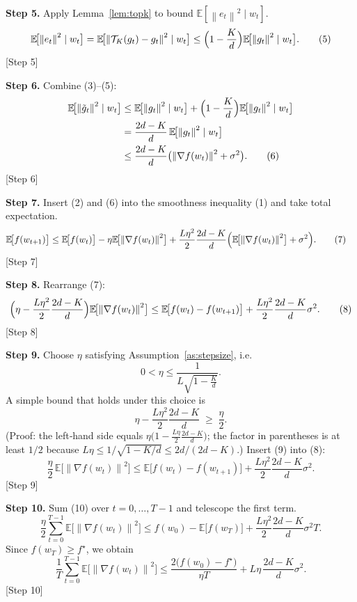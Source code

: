 \documentclass{article}
\newcommand{\E}{\mathbb{E}}
\newcommand{\norm}[1]{\left\|#1\right\|}
\newcommand{\topk}[1]{\mathcal{T}_K\!\left(#1\right)}
\begin{document}
\noindent\textbf{Step 5.} Apply Lemma~\ref{lem:topk} to bound $\E[\norm{e_t}^{2}\mid w_t]$.
\[
\E\!\bigl[\norm{e_t}^{2}\mid w_t\bigr]
   =\E\!\bigl[\norm{\topk{g_t}-g_t}^{2}\mid w_t\bigr]
   \le\Bigl(1-\frac{K}{d}\Bigr)\E\!\bigl[\norm{g_t}^{2}\mid w_t\bigr].
\tag{5}
\]
[Step 5]

\noindent\textbf{Step 6.} Combine (3)–(5):
\[
\begin{aligned}
\E\!\bigl[\norm{\tilde g_t}^{2}\mid w_t\bigr]
&\le \E\!\bigl[\norm{g_t}^{2}\mid w_t\bigr]
   +\Bigl(1-\frac{K}{d}\Bigr)\E\!\bigl[\norm{g_t}^{2}\mid w_t\bigr] \\
&= \frac{2d-K}{d}\,\E\!\bigl[\norm{g_t}^{2}\mid w_t\bigr] \\
&\le \frac{2d-K}{d}\bigl(\norm{\nabla f(w_t)}^{2}+\sigma^{2}\bigr). \tag{6}
\end{aligned}
\]
[Step 6]

\noindent\textbf{Step 7.} Insert (2) and (6) into the smoothness inequality (1) and take total expectation.
\[
\begin{aligned}
\E\!\bigl[f(w_{t+1})\bigr]
&\le \E\!\bigl[f(w_t)\bigr]
   -\eta\E\!\bigl[\norm{\nabla f(w_t)}^{2}\bigr]
   +\frac{L\eta^{2}}{2}
      \frac{2d-K}{d}\Bigl(\E\!\bigl[\norm{\nabla f(w_t)}^{2}\bigr]
      +\sigma^{2}\Bigr). \tag{7}
\end{aligned}
\]
[Step 7]

\noindent\textbf{Step 8.} Rearrange (7):
\[
\Bigl(\eta-\frac{L\eta^{2}}{2}\frac{2d-K}{d}\Bigr)
   \E\!\bigl[\norm{\nabla f(w_t)}^{2}\bigr]
\le \E\!\bigl[f(w_t)-f(w_{t+1})\bigr]
   +\frac{L\eta^{2}}{2}\frac{2d-K}{d}\sigma^{2}. \tag{8}
\]
[Step 8]

\noindent\textbf{Step 9.} Choose $\eta$ satisfying Assumption~\ref{as:stepsize}, i.e.
\[
0<\eta\le \frac{1}{L\sqrt{1-\frac{K}{d}}}.
\]
A simple bound that holds under this choice is
\[
\eta-\frac{L\eta^{2}}{2}\frac{2d-K}{d}
\;\ge\;
\frac{\eta}{2}. \tag{9}
\]
(Proof: the left‑hand side equals $\eta\bigl(1-\frac{L\eta}{2}\frac{2d-K}{d}\bigr)$; the factor in parentheses is at least $1/2$ because $L\eta\le 1/\sqrt{1-K/d}\le 2d/(2d-K)$.)  
Insert (9) into (8):
\[
\frac{\eta}{2}\,\E\!\bigl[\norm{\nabla f(w_t)}^{2}\bigr]
\le \E\!\bigl[f(w_t)-f(w_{t+1})\bigr]
   +\frac{L\eta^{2}}{2}\frac{2d-K}{d}\sigma^{2}. \tag{10}
\]
[Step 9]

\noindent\textbf{Step 10.} Sum (10) over $t=0,\dots,T-1$ and telescope the first term.
\[
\frac{\eta}{2}\sum_{t=0}^{T-1}\E\!\bigl[\norm{\nabla f(w_t)}^{2}\bigr]
\le f(w_0)-\E\!\bigl[f(w_T)\bigr]
   +\frac{L\eta^{2}}{2}\frac{2d-K}{d}\sigma^{2}T.
\]
Since $f(w_T)\ge f^\star$, we obtain
\[
\frac{1}{T}\sum_{t=0}^{T-1}\E\!\bigl[\norm{\nabla f(w_t)}^{2}\bigr]
\le \frac{2\bigl(f(w_0)-f^\star\bigr)}{\eta T}
   + L\eta\,\frac{2d-K}{d}\sigma^{2}. \tag{11}
\]
[Step 10]
\end{document}
